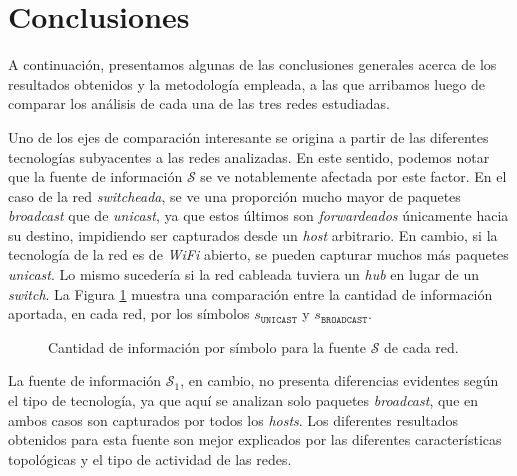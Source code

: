 
\section{Conclusiones}

A continuación, presentamos algunas de las conclusiones generales acerca de
los resultados obtenidos y la metodología empleada, a las que arribamos luego
de comparar los análisis de cada una de las tres redes estudiadas.


Uno de los ejes de comparación interesante se origina a partir de las
diferentes tecnologías subyacentes a las redes analizadas. En este sentido,
podemos notar que la fuente de información $\mathcal{S}$ se ve notablemente
afectada por este factor. En el caso de la red \emph{switcheada}, se ve una
proporción mucho mayor de paquetes \emph{broadcast} que de \emph{unicast}, ya
que estos últimos son \emph{forwardeados} únicamente hacia su destino,
impidiendo ser capturados desde un \emph{host} arbitrario. En cambio, si la
tecnología de la red es de \emph{WiFi} abierto, se pueden capturar muchos más
paquetes \emph{unicast}. Lo mismo sucedería si la red cableada tuviera un
\emph{hub} en lugar de un \emph{switch}. La Figura \ref{general:s} muestra
una comparación entre la cantidad de información aportada, en cada red,
por los símbolos $s_{\mathtt{UNICAST}}$ y $s_{\mathtt{BROADCAST}}$.

\begin{figure}[H]
    \caption{Cantidad de información por símbolo para la fuente $\mathcal{S}$
        de cada red.}
    \label{general:s}
\end{figure}

La fuente de información $\mathcal{S}_1$, en cambio, no presenta diferencias
evidentes según el tipo de tecnología, ya que aquí se analizan solo paquetes
\emph{broadcast}, que en ambos casos son capturados por todos los
\emph{hosts}. Los diferentes resultados obtenidos para esta fuente son mejor
explicados por las diferentes características topológicas y el tipo de
actividad de las redes.


